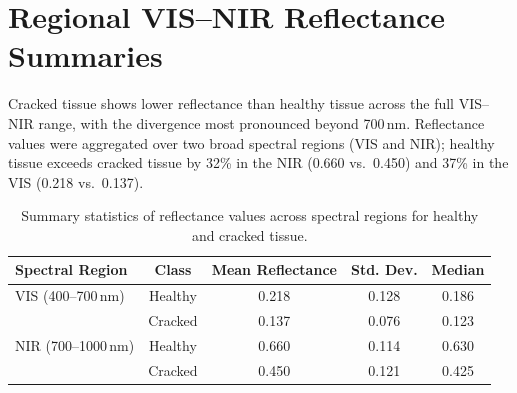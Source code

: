 \section{Regional VIS--NIR Reflectance Summaries}
\label{app:vis_nir_summary}

\noindent
Cracked tissue shows lower reflectance than healthy tissue across the full VIS--NIR range, with the divergence most pronounced beyond 700\,nm.
Reflectance values were aggregated over two broad spectral regions (VIS and NIR); healthy tissue exceeds cracked tissue by 32\% in the NIR (0.660 vs.\ 0.450) and 37\% in the VIS (0.218 vs.\ 0.137).

\begin{table}[htbp]
    \centering
    \caption[Reflectance statistics: healthy vs.\ cracked tissue]{Summary statistics of reflectance values across spectral regions for healthy and cracked tissue.}
    \label{tab:reflectance_stats}
    \renewcommand{\arraystretch}{1.2}
    \begin{tabular}{@{}lcccc@{}}
        \toprule
        Spectral Region & Class & Mean Reflectance & Std. Dev. & Median \\
        \midrule
        VIS (400--700\,nm) & Healthy & 0.218 & 0.128 & 0.186 \\
                          & Cracked & 0.137 & 0.076 & 0.123 \\
        NIR (700--1000\,nm) & Healthy & 0.660 & 0.114 & 0.630 \\
                           & Cracked & 0.450 & 0.121 & 0.425 \\
        \bottomrule
    \end{tabular}
\end{table}

